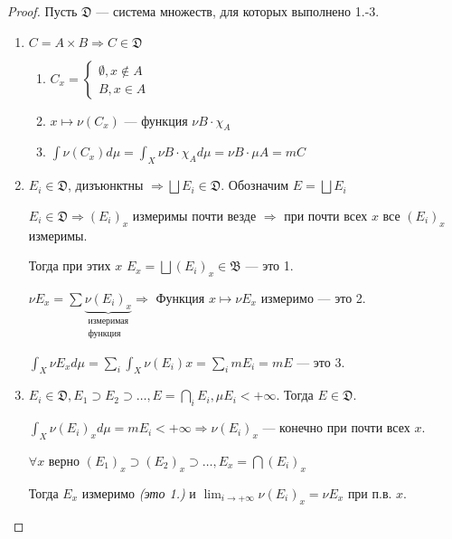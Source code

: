 \begin{proof}
    Пусть \(\mathfrak{D}\) --- система множеств, для которых выполнено 1.-3.

    \begin{enumerate}
        \item \(C = A \times B \Rightarrow C\in \mathfrak{D}\)

              \begin{enumerate}
                  \item \(C_x = \begin{cases}
                            \emptyset, x\notin A \\
                            B, x\in A
                        \end{cases}\)
                  \item \(x \mapsto \nu(C_x)\) --- функция \(\nu B \cdot \chi_A\)
                  \item \(\int \nu(C_x) d\mu = \int_X \nu B \cdot \chi_A d \mu = \nu B \cdot \mu A = mC\)
              \end{enumerate}

        \item \(E_i \in \mathfrak{D}\), дизъюнктны \( \Rightarrow \bigsqcup E_i\in \mathfrak{D}\). Обозначим \(E = \bigsqcup E_i\)

              \(E_i \in \mathfrak{D} \Rightarrow (E_i)_x\) измеримы почти везде \( \Rightarrow \) при почти всех \(x\) все \((E_i)_x\) измеримы.

              Тогда при этих \(x\) \(E_x = \bigsqcup (E_i)_x \in \mathfrak{B}\) --- это 1.

              \(\nu E_x = \sum \underbrace{\nu(E_i)_x}_{\substack{\text{измеримая} \\ \text{функция}}} \Rightarrow\) Функция \(x \mapsto \nu E_x\) измеримо --- это 2.

              \(\int_X \nu E_x d\mu = \sum_i \int_X \nu(E_i) x = \sum_i m E_i = m E\) --- это 3.

        \item \(E_i \in \mathfrak{D}, E_1 \supset E_2 \supset \dots , E = \bigcap_i E_i, \mu E_i < +\infty\). Тогда \(E\in \mathfrak{D}\).

              \(\int_X \nu(E_i)_x d\mu = m E_i < +\infty \Rightarrow \nu(E_i)_x\) --- конечно при почти всех \(x\).

              \(\forall x\) верно \((E_1)_x \supset (E_2)_x \supset \dots , E_x = \bigcap (E_i)_x\)

              Тогда \(E_x\) измеримо \textit{(это 1.)} и \(\lim_{i \to +\infty} \nu(E_i)_x = \nu E_x\) при п.в. \(x\).


\end{enumerate}
\end{proof}

